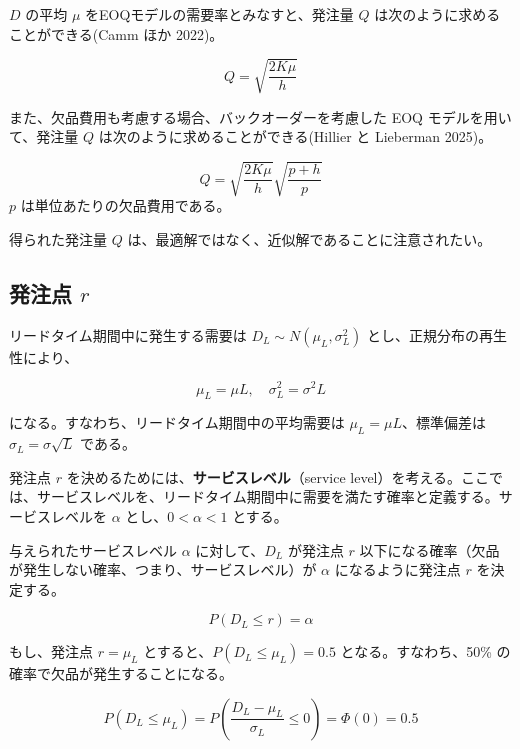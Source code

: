 \documentclass[
  japanese,
  letterpaper,
]{ltjbook}
\theoremstyle{plain}
\theoremstyle{definition}
\theoremstyle{remark}
\begin{document}
\(D\) の平均 \(\mu\) をEOQモデルの需要率とみなすと、発注量 \(Q\)
は次のように求めることができる(Camm ほか 2022)。

\[
Q = \sqrt{\frac{2K \mu}{h}}
\]

また、欠品費用も考慮する場合、バックオーダーを考慮した EOQ
モデルを用いて、発注量 \(Q\) は次のように求めることができる(Hillier と
Lieberman 2025)。

\[
Q = \sqrt{\frac{2K \mu}{h}} \sqrt{\frac{p+h}{p}}
\] \(p\) は単位あたりの欠品費用である。

得られた発注量 \(Q\)
は、最適解ではなく、近似解であることに注意されたい。

\subsection{\texorpdfstring{発注点
\(r\)}{発注点 r}}\label{ux767aux6ce8ux70b9-r}

リードタイム期間中に発生する需要は \(D_L \sim N(\mu_L, \sigma_L^2)\)
とし、正規分布の再生性により、

\[
\mu_L = \mu L, \quad \sigma_L^2 = \sigma^2 L
\]

になる。すなわち、リードタイム期間中の平均需要は
\(\mu_L = \mu L\)、標準偏差は \(\sigma_L = \sigma \sqrt{L}\) である。

発注点 \(r\) を決めるためには、\textbf{サービスレベル}（service
level）を考える。ここでは、サービスレベルを、リードタイム期間中に需要を満たす確率と定義する。サービスレベルを
\(\alpha\) とし、\(0 < \alpha < 1\) とする。

与えられたサービスレベル \(\alpha\) に対して、\(D_L\) が発注点 \(r\)
以下になる確率（欠品が発生しない確率、つまり、サービスレベル）が
\(\alpha\) になるように発注点 \(r\) を決定する。

\[
P(D_L \leq r) = \alpha
\]

もし、発注点 \(r = \mu_L\) とすると、\(P(D_L \leq \mu_L) = 0.5\)
となる。すなわち、50\% の確率で欠品が発生することになる。

\begin{tcolorbox}[enhanced jigsaw, colbacktitle=quarto-callout-note-color!10!white, breakable, opacitybacktitle=0.6, bottomrule=.15mm, title=\textcolor{quarto-callout-note-color}{\faInfo}\hspace{0.5em}{ノート}, leftrule=.75mm, toprule=.15mm, titlerule=0mm, colback=white, colframe=quarto-callout-note-color-frame, bottomtitle=1mm, toptitle=1mm, arc=.35mm, rightrule=.15mm, opacityback=0, left=2mm, coltitle=black]

\[
P(D_L \leq \mu_L) = P\left(\frac{D_L - \mu_L}{\sigma_L} \leq 0\right) = \Phi(0) = 0.5
\]

\end{tcolorbox}
\end{document}
